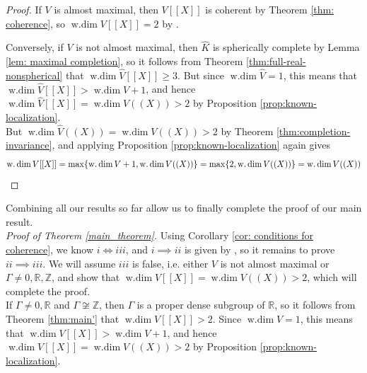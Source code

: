 \documentclass[12pt]{amsart}
\theoremstyle{plain}
\newcommand{\wdim}{\operatorname{w.dim}}
\begin{document}
\begin{proof}

If $V$ is almost maximal, then $V[[X]]$ is coherent by Theorem \ref{thm: coherence}, so $\wdim V[[X]]=2$ by \cite[Lemma 1]{JondrupSmall}.

Conversely, if $V$ is not almost maximal, then $\widehat{K}$ is spherically complete by Lemma \ref{lem: maximal completion}, so it follows from Theorem \ref{thm:full-real-nonspherical} that $\wdim\widehat{V}[[X]]\geq 3$. But since $\wdim\widehat{V}=1$, this means that $\wdim \widehat{V}[[X]]>\wdim\widehat{V}+1$, and hence $\wdim\widehat{V}[[X]]=\wdim\widehat{V}((X))>2$ by Proposition \ref{prop:known-localization}.\\

\noindent But $\wdim\widehat{V}((X))=\wdim V((X))>2$ by Theorem \ref{thm:completion-invariance}, and applying Proposition \ref{prop:known-localization} again gives $$\wdim V[[X]]=\max\{\wdim V+1,\wdim V((X))\}=\max\{2,\wdim V((X))\}=\wdim V((X))\qedhere$$
\end{proof}

\noindent Combining all our results so far allow us to finally complete the proof of our main result.\\

\noindent\emph{Proof of Theorem \ref{main_theorem}.} Using Corollary \ref{cor: conditions for coherence}, we know $i\iff iii$, and $i\implies ii$ is given by \cite[Lemma 1.1]{JondrupSmall}, so it remains to prove $ii\implies iii$. We will assume $iii$ is false, i.e. either $V$ is not almost maximal or $\Gamma\neq 0,\mathbb{R},\mathbb{Z}$, and show that $\wdim V[[X]]=\wdim V((X))>2$, which will complete the proof.\\

\noindent If $\Gamma\neq 0,\mathbb{R}$ and $\Gamma\not\cong\mathbb{Z}$, then $\Gamma$ is a proper dense subgroup of $\mathbb{R}$, so it follows from Theorem \ref{thm:main'} that $\wdim V[[X]]>2$. Since $\wdim V=1$, this means that $\wdim V[[X]]>\wdim V+1$, and hence $\wdim V[[X]]=\wdim V((X))>2$ by Proposition \ref{prop:known-localization}.\\
\end{document}
